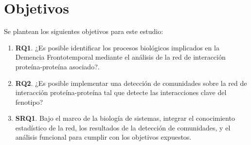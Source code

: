 \section{Objetivos}

Se plantean los siguientes objetivos para este estudio:

\begin{enumerate}
	\item \textbf{RQ1}. ¿Es posible identificar los procesos biológicos implicados en la Demencia Frontotemporal mediante el análisis de la red de interacción proteína-proteína asociado?.
	\item \textbf{RQ2}. ¿Es posible implementar una detección de comunidades sobre la red de interacción proteína-proteína tal que detecte las interacciones clave del fenotipo?
	
	\item \textbf{SRQ1}. Bajo el marco de la biología de sistemas, integrar el conocimiento estadístico de la red, los resultados de la detección de comunidades, y el análisis funcional para cumplir con los objetivos expuestos.
\end{enumerate}

